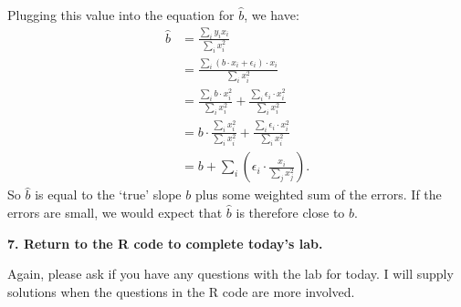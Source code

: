 \documentclass[12pt,hidelinks]{article}
\numberwithin{equation}{section}
\begin{document}
Plugging this value into the equation for $\widehat{b}$, we have:
\begin{align*}
\widehat{b} &= \frac{\sum_i y_i x_i}{\sum_i x_i^2} \\
&= \frac{\sum_i (b \cdot x_i + \epsilon_i) \cdot x_i}{\sum_i x_i^2} \\
&= \frac{\sum_i b \cdot x_i^2}{\sum_i x_i^2} + \frac{\sum_i \epsilon_i \cdot x_i^2}{\sum_i x_i^2} \\
&= b \cdot \frac{\sum_i x_i^2}{\sum_i x_i^2} + \frac{\sum_i \epsilon_i \cdot x_i^2}{\sum_i x_i^2} \\
&= b + \sum_i \left( \epsilon_i \cdot \frac{x_i}{\sum_j x_j^2} \right).
\end{align*}
So $\widehat{b}$ is equal to the `true' slope $b$ plus some weighted sum of
the errors. If the errors are small, we would expect that $\widehat{b}$ is
therefore close to $b$.

\vspace*{12pt}

\textbf{7. Return to the R code to complete today's lab.}

\vspace*{12pt}

Again, please ask if you have any questions with the lab for today. I will
supply solutions when the questions in the R code are more involved.
\end{document}
